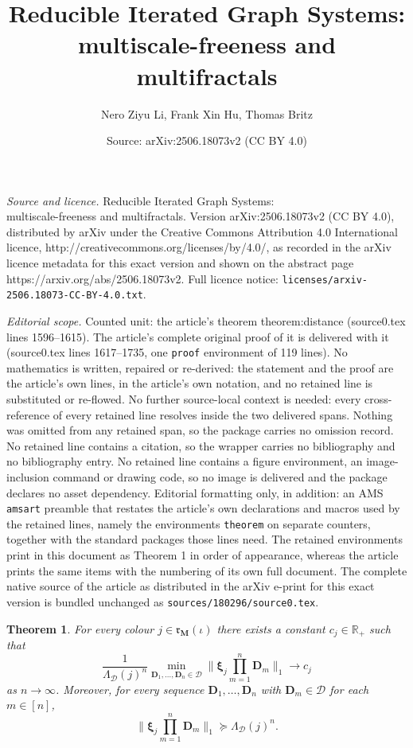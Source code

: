 \documentclass[10pt,a4paper]{amsart}
\title{Reducible Iterated Graph Systems: \\ multiscale-freeness and multifractals}
\author{Nero Ziyu Li, Frank Xin Hu, Thomas Britz}
\date{Source: arXiv:2506.18073v2 (CC BY 4.0)}
\newtheorem{theorem}{Theorem}
\newcommand*{\bbbxi}{\boldsymbol{\xi}}
\begin{document}
\maketitle

\noindent\emph{Source and licence.} Reducible Iterated Graph Systems: \\ multiscale-freeness and multifractals. Version arXiv:2506.18073v2 (CC BY 4.0), distributed by arXiv under the Creative Commons Attribution 4.0 International licence, http://creativecommons.org/licenses/by/4.0/, as recorded in the arXiv licence metadata for this exact version and shown on the abstract page https://arxiv.org/abs/2506.18073v2. Full licence notice: \texttt{licenses/arxiv-2506.18073-CC-BY-4.0.txt}.\par\smallskip

\noindent\textit{Editorial scope.} Counted unit: the article's theorem theorem:distance (source0.tex lines 1596--1615). The article's complete original proof of it is delivered with it (source0.tex lines 1617--1735, one \texttt{proof} environment of 119 lines). No mathematics is written, repaired or re-derived: the statement and the proof are the article's own lines, in the article's own notation, and no retained line is substituted or re-flowed.  No further source-local context is needed: every cross-reference of every retained line resolves inside the two delivered spans.  Nothing was omitted from any retained span, so the package carries no omission record.  No retained line contains a citation, so the wrapper carries no bibliography and no bibliography entry.  No retained line contains a figure environment, an image-inclusion command or drawing code, so no image is delivered and the package declares no asset dependency.  Editorial formatting only, in addition: an AMS \texttt{amsart} preamble that restates the article's own declarations and macros used by the retained lines, namely the environments \texttt{theorem} on separate counters, together with the standard packages those lines need.  The retained environments print in this document as Theorem 1 in order of appearance, whereas the article prints the same items with the numbering of its own full document.  The complete native source of the article as distributed in the arXiv e-print for this exact version is bundled unchanged as \texttt{sources/180296/source0.tex}.
\begin{theorem}\label{theorem:distance}
For every colour $j\in\mathfrak r_{\mathbf M}(\iota)$ there exists a constant $c_j\in\mathbb R_+$ such that
\[
\frac{1}{\Lambda_{\mathcal D}(j)^n}
\min_{\mathbf D_1,\ldots,\mathbf D_n\in\mathcal D}
\bigg\|
\bbbxi_j\prod_{m=1}^n \mathbf D_m
\bigg\|_1
\to c_j
\]
as $n\to\infty$.
Moreover, for every sequence $\mathbf D_1,\ldots,\mathbf D_n$ with $\mathbf D_m\in\mathcal D$ for each $m\in[n]$,
\[
\bigg\|
\bbbxi_j\prod_{m=1}^n \mathbf D_m
\bigg\|_1
\succeq
\Lambda_{\mathcal D}(j)^n.
\]
\end{theorem}
\end{document}
